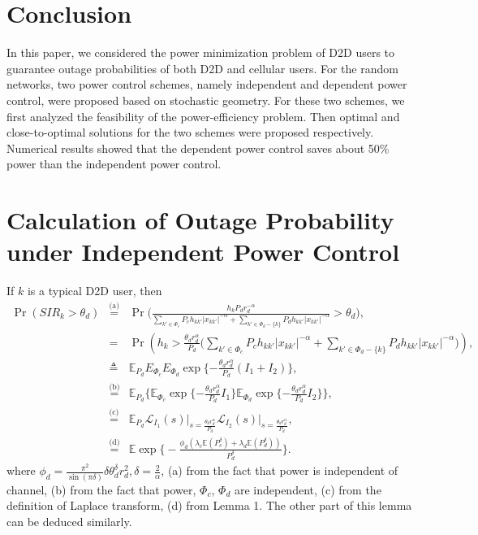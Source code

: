 \documentclass[12pt, draftclsnofoot, journal, letterpaper, onecolumn]{IEEEtran}
\begin{document}
\section{Conclusion}

In this paper, we considered the power minimization problem of D2D users to guarantee outage probabilities of both D2D and cellular users. For the random networks, two power control schemes, namely independent and dependent power control, were proposed based on stochastic geometry. For these two schemes, we first analyzed the feasibility of the power-efficiency problem. Then optimal and close-to-optimal solutions for the two schemes were proposed respectively. Numerical results showed that the dependent power control saves about 50\% power than the independent power control.








\appendices
\section{Calculation of Outage Probability under Independent Power Control}\label{COPIPC}
\begin{IEEEproof}
If $k$ is a typical D2D user, then
\begin{eqnarray*}
\Pr(SIR_k>\theta_d) & \overset{\text{(a)}}{=} & \Pr\big(\frac{h_kP_dr_d^{-\alpha}}{\sum_{k'\in\Phi_c}P_ch_{kk'}|x_{kk'}|^{-\alpha}+\sum_{k'\in\Phi_d-\{k\}}P_dh_{kk'}|x_{kk'}|^{-\alpha}}>\theta_d\big),\\
&=&
\Pr(h_k>\frac{\theta_d r_d^\alpha}{P_d}\big(\sum_{k'\in\Phi_c}P_ch_{kk'}|x_{kk'}|^{-\alpha}+\sum_{k'\in\Phi_d-\{k\}}P_dh_{kk'}|x_{kk'}|^{-\alpha}\big)),\\
&\triangleq&\mathbb{E}_{P_d}E_{\Phi_c}E_{\Phi_d}\exp\{-\frac{\theta_d r_d^\alpha}{P_d}(I_1+I_2)\},\\
& \overset{\text{(b)}}{=} & \mathbb{E}_{P_d}\big\{\mathbb{E}_{\Phi_c}\exp\{-\frac{\theta_d r_d^\alpha}{P_d}I_1\}\mathbb{E}_{\Phi_d}\exp\{-\frac{\theta_d r_d^\alpha}{P_d}I_2\}\big\},\\
& \overset{\text{(c)}}{=} & \mathbb{E}_{P_d}\mathcal{L}_{I_1}(s)\big|_{s=\frac{\theta_d r_d^\alpha}{P_d}}\mathcal{L}_{I_2}(s)\big|_{s=\frac{\theta_d r_d^\alpha}{P_d}},\\
& \overset{\text{(d)}}{=} & \mathbb{E}\exp\big\{-\frac{\phi_d(\lambda_c\mathbb{E}(P_c^{\delta})+\lambda_d\mathbb{E}(P_d^{\delta}))}{P_d^\delta}\big\}.
\end{eqnarray*}
where $\phi_d=\frac{\pi^2}{\sin(\pi\delta)}\delta\theta_d^\delta r_d^2,\delta=\frac{2}{\alpha}$,
(a) from the fact that power is independent of channel,
(b) from the fact that power, $\Phi_c$, $\Phi_d$ are independent,
(c) from the definition of Laplace transform,
(d) from \cite{RPC2} Lemma 1. The other part of this lemma can be deduced similarly.
\end{IEEEproof}
\end{document}
